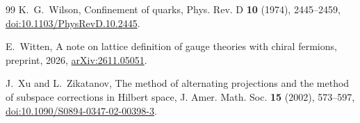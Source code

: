 \documentclass[aps,prd,twocolumn,superscriptaddress,nofootinbib,longbibliography,floatfix,amsmath,amssymb,10pt]{revtex4-2}
\theoremstyle{definition}
\theoremstyle{remark}
\begin{document}
\begin{thebibliography}{99}
K.~G.~Wilson, Confinement of quarks, Phys. Rev. D \textbf{10} (1974),
2445--2459, \href{https://doi.org/10.1103/PhysRevD.10.2445}{doi:10.1103/PhysRevD.10.2445}.

E.~Witten, A note on lattice definition of gauge theories with chiral
fermions, preprint, 2026, \href{https://arxiv.org/abs/2611.05051}{arXiv:2611.05051}.

J.~Xu and L.~Zikatanov, The method of alternating projections and the
method of subspace corrections in Hilbert space, J. Amer. Math. Soc.
\textbf{15} (2002), 573--597,
\href{https://doi.org/10.1090/S0894-0347-02-00398-3}{doi:10.1090/S0894-0347-02-00398-3}.

\end{thebibliography}
\end{document}
